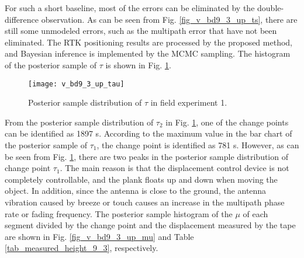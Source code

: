 \documentclass[journal]{IEEEtran}
\begin{document}
For such a short baseline, most of the errors can be eliminated by the double-difference observation. 
As can be seen from Fig. \ref{fig_v_bd9_3_up_ts}, there are still some unmodeled errors, such as the multipath error that have not been eliminated. 
The RTK positioning results are processed by the proposed method, and Bayesian inference is implemented by the MCMC sampling. 
The histogram of the posterior sample of $\tau$ is shown in Fig. \ref{fig_v_bd9_3_up_tau}.

\begin{figure}[htbp]
	\centering
	\texttt{[image: v\_bd9\_3\_up\_tau]}
	\caption{Posterior sample distribution of $\tau$ in field experiment 1.}
	\label{fig_v_bd9_3_up_tau}
\end{figure} 
From the posterior sample distribution of $\tau_2$ in Fig. \ref{fig_v_bd9_3_up_tau}, one of the change points can be identified as 1897 s. 
According to the maximum value in the bar chart of the posterior sample of $\tau_1$, the change point is identified as 781 s.
However, as can be seen from Fig. \ref{fig_v_bd9_3_up_tau}, there are two peaks in the posterior sample distribution of change point $\tau_1$.
The main reason is that the displacement control device is not completely controllable, and the plank floats up and down when moving the object. 
In addition, since the antenna is close to the ground, the antenna vibration caused by breeze or touch causes an increase in the multipath phase rate or fading frequency\cite{kelly2003characterization}. 
The posterior sample histogram of the $\mu$ of each segment divided by the change point and the displacement measured by the tape are shown in Fig. \ref{fig_v_bd9_3_up_mu} and Table \ref{tab_measured_height_9_3}, respectively.
\end{document}
